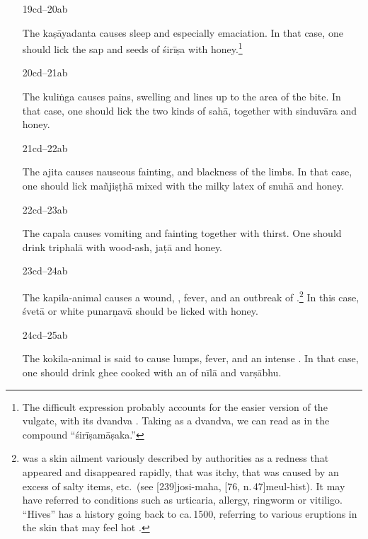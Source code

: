 \begin{translation}
\begin{itemize}
\item[19cd--20ab]

The \Gls{kaṣāyadanta} causes sleep and especially emaciation. 
In that case, one should lick the sap and seeds of \gls{śirīṣa} with 
honey.\footnote{The difficult expression  
probably accounts for the easier version of the vulgate, with its dvandva 
.  Taking  as a dvandva, we can read 
 as in the compound  “\gls{śirīṣamāṣaka}.”}

\item[20cd--21ab]

The \Gls{kuliṅga} causes pains, swelling and lines up to the area of the bite.
In that case, one should lick the two kinds of \gls{sahā}, together with 
\gls{sinduvāra} and honey.  

\item[21cd--22ab]

The \Gls{ajita} causes nauseous fainting,  and 
blackness of the limbs. 
In that case, one should lick \gls{mañjiṣṭhā} mixed with the milky latex of 
\gls{snuhā} and honey. 


\item[22cd--23ab]

The \Gls{capala} causes vomiting and fainting together with thirst.
One should drink \gls{triphalā} with wood-ash, \gls{jaṭā} and 
honey.

\item [23cd--24ab]

The \Gls{kapila-animal} causes a wound, , fever, and an
outbreak of .\footnote{ was a skin
    ailment variously described by authorities as a redness that appeared
    and disappeared rapidly, that was itchy, that was caused by an excess
    of salty items, etc.\ (see [239]{josi-maha},
    [76, n.\,47]{meul-hist}). It may have referred to
    conditions such as urticaria, allergy, ringworm or vitiligo. “Hives” has a 
    history going back to ca.\,1500, referring to various eruptions in the skin that 
    may feel hot \citep[s.v.\ 
    “\href{https://doi.org/10.1093/OED/3255856400}{hives (n.)}”]{OED}.} In 
    this
    case, \gls{śvetā} or white \gls{punarṇavā} should be licked with
    honey.

\item[24cd--25ab]

The \Gls{kokila-animal} is said to cause lumps, fever, and an intense 
\se{dāha}{feeling of heat}. 
In that case, one should drink  ghee cooked with an 
of  \gls{nīlā} and \gls{varṣābhu}. 



\end{itemize}
\end{translation}
